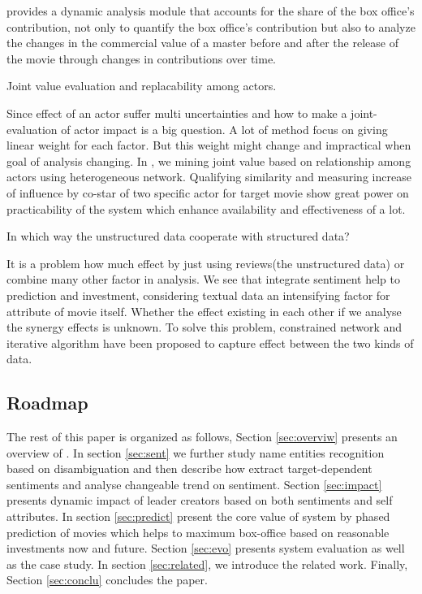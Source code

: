 \system provides a dynamic analysis module that accounts for the share of the box office's contribution, not only to quantify the box office's contribution but also to analyze the changes in the commercial value of a master before and after the release of the movie through changes in contributions over time.
\begin{difficulties} Joint value evaluation and replacability among actors.\end{difficulties}
\par Since effect of an actor suffer multi uncertainties and how to make a joint-evaluation of actor impact is a big question. A lot of method focus on giving linear weight for each factor. But this weight might change and impractical when goal of analysis changing. In \system, we mining joint value based on relationship among actors using heterogeneous network. Qualifying similarity and measuring increase of influence by co-star of two specific actor for target movie show great power on practicability of the system which enhance availability and effectiveness of \system a lot.
\begin{difficulties}
In which way the unstructured data cooperate with structured data?
\end{difficulties}
\par It is a  problem how much effect by just using reviews(the unstructured data) or combine many other factor in analysis. We see that integrate sentiment help to prediction and investment, considering textual data an intensifying factor for attribute of movie itself. Whether the effect existing in each other if we analyse the synergy effects is unknown. To solve this problem, constrained network and iterative algorithm have been proposed to capture effect between the two kinds of data.

\subsection{Roadmap}
The rest of this paper is organized as follows, Section \ref{sec:overviw} presents an overview of \system. In section \ref{sec:sent} we further study name entities recognition based on disambiguation and then describe how \system extract target-dependent sentiments and analyse changeable trend on sentiment. Section \ref{sec:impact} presents dynamic impact of leader creators based on both sentiments and self attributes. In section \ref{sec:predict} present the core value of system by phased prediction of movies which helps to maximum box-office based on reasonable investments now and future. Section \ref{sec:evo} presents system evaluation as well as the case study. In section \ref{sec:related}, we introduce the related work. Finally, Section \ref{sec:conclu} concludes the paper. 